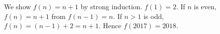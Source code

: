 We show $f(n)=n+1$ by strong induction. $f(1)=2$. If $n$ is even, $f(n)=n+1$ from $f(n-1)=n$. If $n>1$ is odd, $f(n)=(n-1)+2=n+1$. Hence $f(2017)=\boxed{2018}$.
